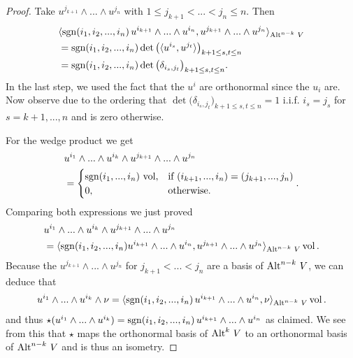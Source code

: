 \documentclass[../master_thesis.tex]{subfiles}
\begin{document}
\begin{proof}
    Take $u^{j_{k+1}} \wedge ... \wedge u^{j_n}$ with 
    $1 \leq j_{k+1} < ... < j_n \leq n$. Then 
    \begin{align*}
        &\langle \operatorname{sgn}(i_1,i_2,...,i_n) \, u^{i_{k+1}} \wedge ... \wedge u^{i_{n}},
            u^{j_{k+1}} \wedge ... \wedge u^{j_{n}} \rangle_{{\operatorname{Alt}^{n-k}\,V}}
        \\ &= \operatorname{sgn}(i_1,i_2,...,i_n) \det \big( \langle u^{i_s}, u^{j_t} \rangle \big)_{k+1 \leq s,t \leq n}
        \\ &= \operatorname{sgn}(i_1,i_2,...,i_n) \det \big( \delta_{i_s,j_t} \big)_{k+1 \leq s,t \leq n}.
    \end{align*}
    In the last step, we used the fact that the $u^i$ are orthonormal since the $u_i$ 
    are. Now observe due to the ordering that 
    $\det \big( \delta_{i_s,j_t} \big)_{k+1 \leq s,t \leq n} = 1$ i.i.f.
    $i_s = j_s$ for $s = k+1,...,n$ and is zero otherwise.

    For the wedge product we get
    \begin{align*}
        &u^{i_1} \wedge ... \wedge u^{i_{k}} \wedge u^{j_{k+1}} \wedge ... 
            \wedge u^{j_n}
        \\ &=   \begin{cases}
                \operatorname{sgn}(i_1, ..., i_n)\, \operatorname{vol}, & \text{if $(i_{k+1},...,i_n) = (j_{k+1},...,j_n)$} \\
                0,  & \text{otherwise.}
            \end{cases}.
    \end{align*}
    Comparing both expressions we just proved
    \begin{align*}
        &u^{i_1} \wedge ... \wedge u^{i_{k}} \wedge u^{j_{k+1}} \wedge ... \wedge u^{j_n}
        \\ &= \langle \operatorname{sgn}(i_1,i_2,...,i_n) u^{i_{k+1}} \wedge ... \wedge u^{i_{n}},
            u^{j_{k+1}} \wedge ... \wedge u^{j_{n}} \rangle_{{\operatorname{Alt}^{n-k}\,V}} \operatorname{vol}.
    \end{align*}
    Because the $u^{j_{k+1}} \wedge ... \wedge u^{j_n}$ for $j_{k+1} < ... < j_n$ are a 
    basis of ${\operatorname{Alt}^{n-k}\,V}$, we can deduce that 
    \begin{align*}
        u^{i_1} \wedge ... \wedge u^{i_{k}} \wedge \nu = \langle \operatorname{sgn}(i_1,i_2,...,i_n)\, u^{i_{k+1}} \wedge 
        ... \wedge u^{i_{n}}, \nu \rangle_{{\operatorname{Alt}^{n-k}\,V}} \operatorname{vol}.
    \end{align*}
    and thus  
    $\star (u^{i_1} \wedge ... \wedge u^{i_{k}}) = 
    \operatorname{sgn}(i_1,i_2,...,i_n)\, u^{i_{k+1}} \wedge ... \wedge u^{i_{n}}$ as claimed.
    We see from this that $\star$ maps the orthonormal basis of ${\operatorname{Alt}^{k}\,V}$ 
    to an orthonormal
    basis of ${\operatorname{Alt}^{n-k}\,V}$ and is thus an isometry.


\end{proof}
\end{document}

